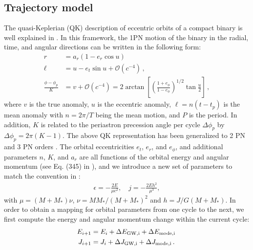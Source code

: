 \documentclass[prd,aps,floatfix,superscriptaddress,nofootinbib,twocolumn,10pt,English]{revtex4}
\begin{document}
\subsection{Trajectory model}

The quasi-Keplerian (QK) description of eccentric orbits of a compact binary is
well explained in \cite{blanchet2014gravitational}. In this framework, the 1PN
motion of the binary in the radial, time, and angular directions can be written in
the following form:
\begin{align}\label{eqtra1pn}
r &= a_r (1- e_r \cos u)\,\nonumber \\
\ell &= u-e_t \sin u +\mathcal{O}(c^{-4})\,,\nonumber \\
\frac{\phi-\phi_p}{K} & = v+\mathcal{O}(c^{-4}) = 2 \arctan \left [ \left ( \frac{1+e_\phi}{1-e_\phi}\right )^{1/2} \tan \frac{u}{2}\right ]\,,
\end{align}
where $v$ is the true anomaly, $u$ is the eccentric anomaly, $\ell = n (t-t_p)$ is the mean anomaly
with $n=2\pi/T $ being the mean motion, and $P$ is the period. In addition, $K$
is related to the periastron precession angle  per cycle $\Delta \phi_p$ by
$\Delta \phi_p =2 \pi (K-1)$. The above QK representation has been generalized
to 2 PN \cite{damour1988higher,schafer1993second,wex1995second} and 3 PN orders
\cite{memmesheimer2004third}. The orbital eccentricities $e_t$, $e_r$, and $e_\phi$, and
additional parameters $n$, $K$, and $a_r$ are all functions of the orbital energy and
angular momentum (see Eq. (345) in \cite{blanchet2014gravitational}), and we
introduce a new set of parameters to match the convention in
\cite{blanchet2014gravitational}:
\begin{align}\label{eqrej}
\epsilon = -\frac{2 E}{\mu c^2},\quad j = -\frac{2 E h^2}{\mu^3},
\end{align}
with $\mu = (M+M_*) \nu $, $\nu = M M_*/(M+M_*)^2$ and $h = J/G(M+M_*)$. In order to obtain a mapping for orbital parameters from one cycle to the next, we first compute the energy and angular momentum change within the current cycle:
\begin{align}\label{eqEJmap}
E_{i+1} & = E_i +\Delta E_{\rm GW,i}+\Delta E_{\rm mode,i}\,\nonumber \\
J_{i+1} & = J_i +\Delta J_{\rm GW,i}+ \Delta J_{\rm mode,i}\,.
\end{align}
\end{document}
